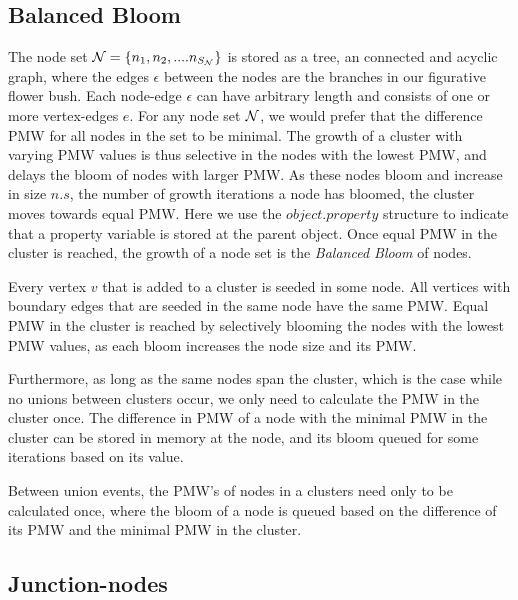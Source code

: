 \subsection{Balanced Bloom}

The node set $\mathcal{N} = \{n_1, n_2, .... n_{S_{\mathcal{N}}}\}$ is stored as a tree, an connected and acyclic graph, where the edges $\epsilon$ between the nodes are the branches in our figurative flower bush. Each node-edge $\epsilon$ can have arbitrary length and consists of one or more vertex-edges $e$. For any node set $\mathcal{N}$, we would prefer that the difference PMW for all nodes in the set to be minimal. The growth of a cluster with varying PMW values is thus selective in the nodes with the lowest PMW, and delays the bloom of nodes with larger PMW. As these nodes bloom and increase in size $n.s$, the number of growth iterations a node has bloomed, the cluster moves towards equal PMW. Here we use the $object.property$ structure to indicate that a property variable is stored at the parent object. Once equal PMW in the cluster is reached, the growth of a node set is the \emph{Balanced Bloom} of nodes.

\begin{theorem}\label{th:balancedbloom}
  Every vertex $v$ that is added to a cluster is seeded in some node. All vertices with boundary edges that are seeded in the same node have the same PMW. Equal PMW in the cluster is reached by selectively blooming the nodes with the lowest PMW values, as each bloom increases the node size and its PMW.
\end{theorem}

Furthermore, as long as the same nodes span the cluster, which is the case while no unions between clusters occur, we only need to calculate the PMW in the cluster once. The difference in PMW of a node with the minimal PMW in the cluster can be stored in memory at the node, and its bloom queued for some iterations based on its value.

\begin{lemma}\label{lem:calconce}
  Between union events, the PMW's of nodes in a clusters need only to be calculated once, where the bloom of a node is queued based on the difference of its PMW and the minimal PMW in the cluster.
\end{lemma}

\subsection{Junction-nodes}

